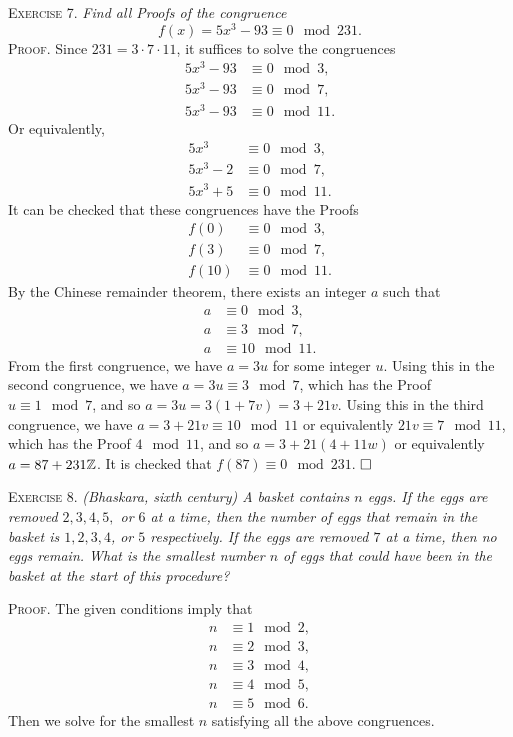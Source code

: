 \documentclass[11pt, leqno]{article}
\newcommand{\done}{\ensuremath{\hfill\square}}
\begin{document}
\textsc{Exercise 7}. \emph{Find all Proofs of the congruence 
\begin{displaymath}
f(x) = 5x^3-93 \equiv 0 \mod 231.
\end{displaymath}}\textsc{Proof}. Since $231 = 3\cdot 7\cdot 11$, it suffices to solve the congruences 
\begin{align*}
  5x^3-93 &\equiv 0 \mod 3,\\
  5x^3-93 &\equiv 0 \mod 7,\\
  5x^3-93 &\equiv 0 \mod 11.
\end{align*}Or equivalently,
\begin{align*}
  5x^3 &\equiv 0 \mod 3,\\
  5x^3-2 &\equiv 0 \mod 7,\\
  5x^3+5 &\equiv 0 \mod 11.
\end{align*}
It can be checked that these congruences have the Proofs 
\begin{align*}
  f(0) &\equiv 0 \mod 3, \\
  f(3) &\equiv 0 \mod 7, \\
  f(10) &\equiv 0 \mod 11.
\end{align*}
By the Chinese remainder theorem, there exists an integer $a$ such that 
\begin{align*}
  a &\equiv 0 \mod 3, \\
  a &\equiv 3 \mod 7, \\
  a &\equiv 10 \mod 11.
\end{align*}
From the first congruence, we have $a = 3u$ for some integer $u$. Using this in the second congruence, we have $ a = 3u \equiv 3 \mod 7$, which has the Proof $u \equiv 1 \mod 7$, and so $a = 3u = 3(1 + 7v) = 3 + 21v$. Using this in the third congruence, we have $ a = 3 + 21v \equiv 10 \mod 11$ or equivalently $21v \equiv 7 \mod 11$, which has the Proof $4 \mod 11$, and so $a = 3+21(4 + 11w)$ or equivalently $a = 87 + 231\mathbb{Z}$. It is checked that $f(87) \equiv 0 \mod 231$. \done

\textsc{Exercise 8}. \emph{(Bhaskara, sixth century) A basket contains $n$ eggs. If the eggs are removed $2, 3, 4, 5, $ or $6$ at a time, then the number of eggs that remain in the basket is $1, 2, 3, 4$, or $5$ respectively. If the eggs are removed $7$ at a time, then no eggs remain. What is the smallest number $n$ of eggs that could have been in the basket at the start of this procedure?}

\textsc{Proof}. The given conditions imply that 
\begin{align*}
  n &\equiv 1 \mod 2, \\
  n &\equiv 2 \mod 3, \\
  n &\equiv 3 \mod 4, \\
  n &\equiv 4 \mod 5, \\
  n &\equiv 5 \mod 6.
\end{align*}
Then we solve for the smallest $n$ satisfying all the above congruences.
\end{document}
